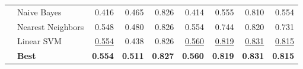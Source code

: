 \documentclass[runningheads]{llncs}
\begin{document}
\begin{table*}[t]
\begin{tabular}{l@{\hskip 0.1in}l@{\hskip 0.1in}r@{\hskip 0.1in}r@{\hskip 0.1in}r@{\hskip 0.1in}r@{\hskip 0.1in}r@{\hskip 0.1in}r@{\hskip 0.1in}r}
		& Naive Bayes              & 0.416          & 0.465          & 0.826          & 0.414          & 0.555          & 0.810           & 0.554          \\
		& Nearest Neighbors        & 0.548          & 0.480           & 0.826          & 0.554          & 0.744          & 0.820           & 0.731          \\
		& Linear SVM               & \underline{0.554}    & 0.438          & 0.826          & \underline{0.560}     & \underline{0.819}    & \underline{0.831}    & \underline{0.815}    \\    \midrule
		& \textbf{Best}          & \textbf{0.554} & \textbf{0.511} & \textbf{0.827} & \textbf{0.560}  & \textbf{0.819} & \textbf{0.831} & \textbf{0.815}	\\    \bottomrule
	\end{tabular}
\end{table*}
\end{document}
